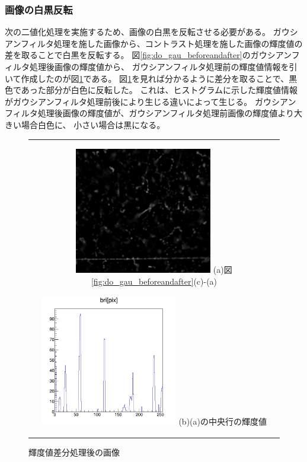 \documentclass[12pt,a4paper]{jarticle}
\begin{document}
\subsubsection{画像の白黒反転}
次の二値化処理を実施するため、画像の白黒を反転させる必要がある。
ガウシアンフィルタ処理を施した画像から、コントラスト処理を施した画像の輝度値の差を取ることで白黒を反転する。
図\ref{fig:do_gau_beforeandafter}のガウシアンフィルタ処理後画像の輝度値から、
ガウシアンフィルタ処理前の輝度値情報を引いて作成したのが図\ref{fig:do_sub}である。
図\ref{fig:do_sub}を見れば分かるように差分を取ることで、黒色であった部分が白色に反転した。
これは、ヒストグラムに示した輝度値情報がガウシアンフィルタ処理前後により生じる違いによって生じる。
ガウシアンフィルタ処理後画像の輝度値が、ガウシアンフィルタ処理前画像の輝度値より大きい場合白色に、
小さい場合は黒になる。
\begin{figure}[htbp]
  \centering
      \begin{tabular}{c}
        \begin{minipage}{0.5\hsize}
          \centering
            \includegraphics[clip, width=60mm]{sub.png}
            \hspace{1.6cm} (a)図\ref{fig:do_gau_beforeandafter}(c)-(a)
        \end{minipage}

        \begin{minipage}{0.5\hsize}
          \centering
            \includegraphics[clip, width=60mm]{sub_hist.png}
            \hspace{1.6cm} (b)(a)の中央行の輝度値
        \end{minipage}
    
      \end{tabular}
      \caption{輝度値差分処理後の画像\label{fig:do_sub}}
\end{figure}
\end{document}
